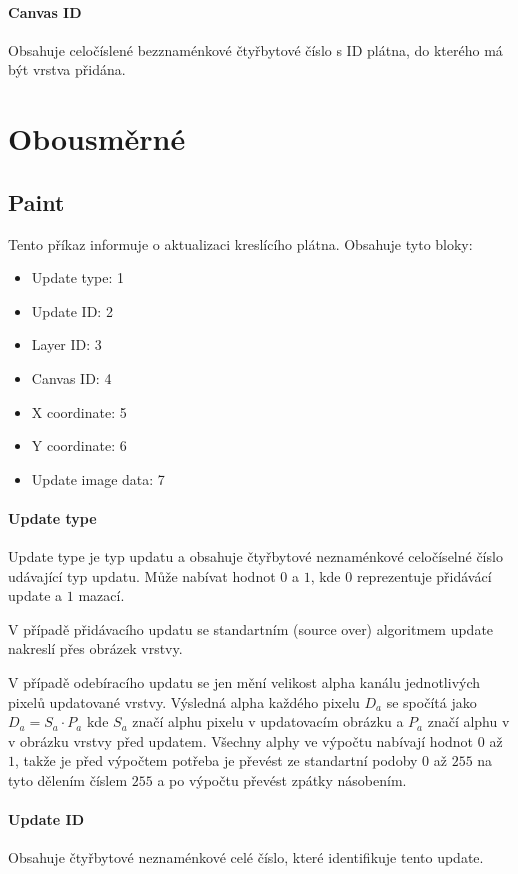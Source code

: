 \documentclass[12pt,oneside,a4paper]{report}
\begin{document}
\paragraph{Canvas ID}
Obsahuje celočíslené bezznaménkové čtyřbytové číslo s ID plátna, do kterého má být vrstva přidána.

\section{Obousměrné}

\subsection{Paint}

Tento příkaz informuje o aktualizaci kreslícího plátna. Obsahuje tyto bloky:

\begin{itemize}
	\item Update type: 1
	\item Update ID: 2
	\item Layer ID: 3
	\item Canvas ID: 4
	\item X coordinate: 5
	\item Y coordinate: 6
	\item Update image data: 7						
\end{itemize}

\paragraph{Update type}
Update type je typ updatu a obsahuje čtyřbytové neznaménkové celočíselné číslo udávající typ updatu. Může nabívat hodnot $0$ a $1$, kde $0$ reprezentuje přidávácí update a $1$ mazací.

V případě přidávacího updatu se standartním (source over) algoritmem update nakreslí přes obrázek vrstvy. 

V případě odebíracího updatu se jen mění velikost alpha kanálu jednotlivých pixelů updatované vrstvy. Výsledná alpha každého pixelu $D_{a}$ se spočítá jako $D_{a} = S_{a} \cdot P_{a}$ kde $S_{a}$ značí alphu pixelu v updatovacím obrázku a $P_{a}$ značí alphu v v obrázku vrstvy před updatem. Všechny alphy ve výpočtu nabívají hodnot $0$ až $1$, takže je před výpočtem potřeba je převést ze standartní podoby $0$ až $255$ na tyto dělením číslem $255$ a po výpočtu převést zpátky násobením.

\paragraph{Update ID}
Obsahuje čtyřbytové neznaménkové celé číslo, které identifikuje tento update.
\end{document}
